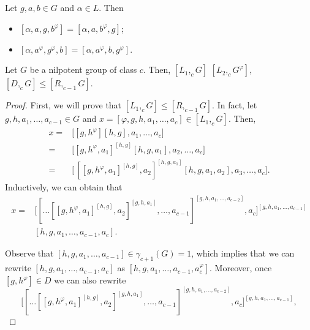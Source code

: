 \documentclass[10pt,a4paper]{amsart}
\begin{document}
\begin{lem}\label{Lm:Rcontas} Let $ g,a,b \in G$ and $\alpha\in L$. Then 
  \begin{itemize}
      \item[(i)]$[\alpha,a,g,b^{\varphi}]=[\alpha,a,b^{\varphi},g]$;
      \item[(ii)]$[\alpha,a^{\varphi},g^{\varphi},b]=[\alpha,a^{\varphi},b,g^{\varphi}].$ 
  \end{itemize}
\end{lem}

\begin{prop}\label{PropR>D}
    Let $G$ be a nilpotent group of class $c$. Then, $
    [L_1,_{c}G]$ $[L_2,_{c}G^{\varphi}]$, $[D,_{c}G] \leq [R,_{c-1}G]$.
\end{prop}

\begin{proof}First, we will prove that $[L_1,_{c}G] \leq [R,_{c-1}G]$. 
    In fact, let $g,h,a_1, \ldots , a_{c-1}\in G$ and $x=[\varphi,g,h,a_1,\ldots ,a_{c}]\in [L_1,_cG]$. Then, 
    \begin{align*}
        x=& \big[[g,h^{\varphi}][h,g],a_1,\ldots ,a_{c}\big]\\
        =& \big[[g,h^{\varphi},a_1]^{[h,g]}[h,g,a_1],a_2, \ldots ,a_{c}\big]\\
         =& \big[ \, [[g,h^{\varphi},a_1]^{[h,g]},a_2]^{[h,g,a_1]} [h,g,a_1,a_2], a_3, \ldots ,a_{c}\big].
        \end{align*}
    Inductively,  we can obtain that
        \begin{align*}
        x=&\big [ [\ldots[[g,h^{\varphi},a_{1}]^{[h,g]},a_{2}]^{[g,h,a_{1}]}, \ldots ,a_{c-1}]^{[g,h,a_{1}, \ldots ,a_{c-2}]} , a_c \big]^{[g,h,a_{1}, \ldots, a_{c-1}]}\\
        & [h,g,a_1, \ldots ,a_{c-1}, a_{c}]. 
        \end{align*}
        
        Observe that $[h,g,a_1, \ldots ,a_{c-1}]\in \gamma_{c+1}(G)=1$, which implies that we can rewrite $[h,g,a_1, \ldots ,a_{c-1}, a_{c}]$ as $[h,g,a_1, \ldots ,a_{c-1}, a^{\varphi}_{c}]$. Moreover, once $[g,h^{\varphi}]\in D$ we can also rewrite 
        \[
\big [ [\ldots[[g,h^{\varphi},a_{1}]^{[h,g]},a_{2}]^{[g,h,a_{1}]}, \ldots ,a_{c-1}]^{[g,h,a_{1}, \ldots ,a_{c-2}]} , a_c \big]^{[g,h,a_{1}, \ldots, a_{c-1}]},
        \]
        

\end{proof}
\end{document}
